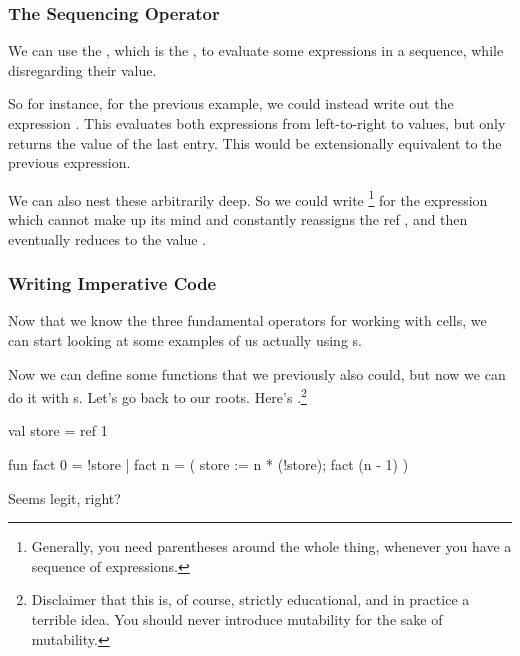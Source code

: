 \documentclass[aspectratio=169]{beamer}
\begin{document}
\begin{frame}[fragile]
  \frametitle{The Sequencing Operator}

  We can use the \code{;}, which is the , to
  evaluate some expressions in a sequence, while disregarding their value.

  \pause
  \vspace{\fill}

  So for instance, for the previous example, we could instead write out the
  expression . This evaluates both expressions from left-to-right
  to values, but only returns the value of the last entry. This would be extensionally
  equivalent to the previous expression.

  \pause
  \vspace{\fill}

  We can also nest these arbitrarily deep. So we could write \footnote{Generally, you need parentheses around the whole
  thing, whenever you have a sequence of expressions.} for the expression which
  cannot make up its mind and constantly reassigns the ref , and then
  eventually reduces to the value .
\end{frame}



\begin{frame}[fragile]
  \frametitle{Writing Imperative Code}

  Now that we know the three fundamental operators for working with 
  cells, we can start looking at some examples of us actually using s.

  \pause
  \vspace{\fill}

  Now we can define some functions that we previously also could,
  but now we can do it with s. Let's go back to our roots. Here's .\footnote{Disclaimer that this is, of course,
  strictly educational, and in practice a terrible idea. You should never introduce
  mutability for the sake of mutability.}

  \pause
  \vspace{\fill}

  \begin{codeblock}
    val store = ref 1

    fun fact 0 = !store
      | fact n =
          ( store := n * (!store);
            fact (n - 1)
          )
  \end{codeblock}

  \pause
  \vspace{\fill}

  Seems legit, right?
\end{frame}
\end{document}
